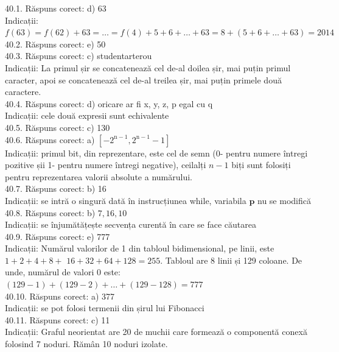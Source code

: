 40.1. Răspuns corect: d) 63\\
Indicații: $f(63)=f(62)+63=\ldots=f(4)+5+6+\ldots+63=8+(5+6+\ldots+63)=2014$\\

40.2. Răspuns corect: e) 50\\

40.3. Răspuns corect: c) studentarterou\\
Indicații: La primul șir se concatenează cel de-al doilea șir, mai puțin primul caracter, apoi se concatenează cel de-al treilea șir, mai puțin primele două caractere.\\

40.4. Răspuns corect: d) oricare ar fi x, y, z, p egal cu q\\
Indicații: cele două expresii sunt echivalente\\

40.5. Răspuns corect: c) 130\\

40.6. Răspuns corect: a) $\left[-2^{\mathrm{n}-1}, 2^{\mathrm{n}-1}-1\right]$\\
Indicații: primul bit, din reprezentare, este cel de semn (0- pentru numere întregi pozitive șii 1- pentru numere întregi negative), ceilalți $n-1$ biți sunt folosiți pentru reprezentarea valorii absolute a numărului.\\

40.7. Răspuns corect: b) 16\\
Indicații: se intră o singură dată în instrucțiunea while, variabila $\mathbf{p}$ nu se modifică\\

40.8. Răspuns corect: b) $7,16,10$\\
Indicații: se înjumătățește secvența curentă în care se face căutarea\\

40.9. Răspuns corect: e) 777\\
Indicații: Numărul valorilor de 1 din tabloul bidimensional, pe linii, este $1+2+4+8+$ $16+32+64+128=255$. Tabloul are 8 linii și 129 coloane. De unde, numărul de valori 0 este: $(129-1)+(129-2)+\ldots+(129-128)=777$\\

40.10. Răspuns corect: a) 377\\
Indicații: se pot folosi termenii din șirul lui Fibonacci\\

40.11. Răspuns corect: c) 11\\
Indicații: Graful neorientat are 20 de muchii care formează o componentă conexă folosind 7 noduri. Rămân 10 noduri izolate.\\


